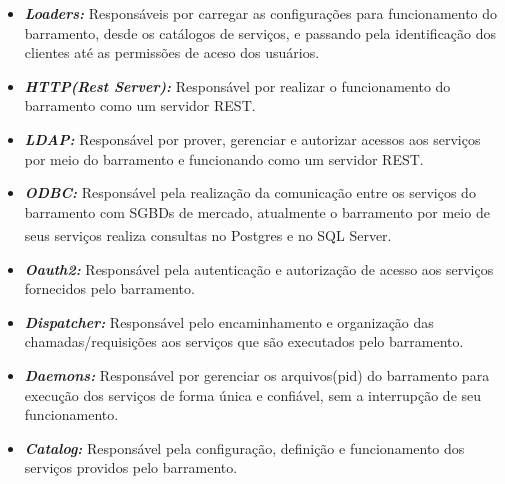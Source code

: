 \begin{itemize}
    \item \textit{\textbf{Loaders:}}
    Responsáveis por carregar as configurações para funcionamento do barramento, desde os catálogos de serviços, e passando pela identificação dos clientes até as permissões de aceso dos usuários.  
    \item \textit{\textbf{HTTP(Rest Server):}}
    Responsável por realizar o funcionamento do barramento como um servidor \acrshort{REST}.
    \item \textit{\textbf{LDAP:}}
    Responsável por prover, gerenciar e autorizar acessos aos serviços por meio do barramento e funcionando como um servidor REST.
    \item \textit{\textbf{ODBC:}}
    Responsável pela realização da comunicação entre os serviços do barramento com SGBDs de mercado, atualmente o barramento por meio de seus serviços realiza consultas no Postgres\textsuperscript{\textregistered} e no SQL Server\textsuperscript{\textregistered}.
    \item \textit{\textbf{Oauth2:}}
    Responsável pela autenticação e autorização de acesso aos serviços fornecidos pelo barramento.
    \item \textit{\textbf{Dispatcher:}}
    Responsável pelo encaminhamento e organização das chamadas/requisições aos serviços que são executados pelo barramento.
    \item \textit{\textbf{Daemons:}}
    Responsável por gerenciar os arquivos(pid) do barramento para execução dos serviços de forma única e confiável, sem a interrupção de seu funcionamento. 
    \item \textit{\textbf{Catalog:}}
    Responsável pela configuração, definição e funcionamento dos serviços providos pelo barramento.
\end{itemize}

